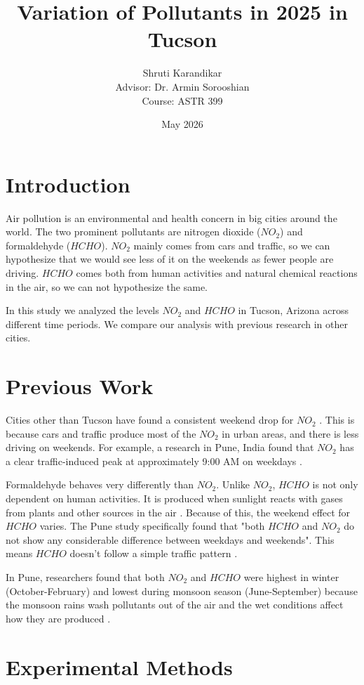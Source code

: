 \documentclass{article}
\title{Variation of Pollutants in 2025 in Tucson}
\author{Shruti Karandikar\\
    \small Advisor: Dr. Armin Sorooshian\\
    \small Course: ASTR 399}
\date{May 2026}
\begin{document}
\maketitle

\section{Introduction}

Air pollution is an environmental and health concern in big cities around the world. The two prominent pollutants are nitrogen dioxide ($NO_2$) and formaldehyde ($HCHO$). $NO_2$ mainly comes from cars and traffic, so we can hypothesize that we would see less of it on the weekends as fewer people are driving. $HCHO$ comes both from human activities and natural chemical reactions in the air, so we can not hypothesize the same.

In this study we analyzed the levels $NO_2$ and $HCHO$ in Tucson, Arizona across different time periods. We compare our analysis with previous research in other cities.

\section{Previous Work}

Cities other than Tucson have found a consistent weekend drop for $NO_2$ \cite{HM2025, BM2021A, BM2021B}. This is because cars and traffic produce most of the $NO_2$ in urban areas, and there is less driving on weekends. For example, a research in Pune, India found that $NO_2$ has a clear traffic-induced peak at approximately 9:00 AM on weekdays \cite{BM2021B}.

Formaldehyde behaves very differently than $NO_2$. Unlike $NO_2$, $HCHO$ is not only dependent on  human activities. It is produced when sunlight reacts with gases from plants and other sources in the air \cite{BM2021A}. Because of this, the weekend effect for $HCHO$ varies. The Pune study specifically found that "both $HCHO$ and $NO_2$ do not show any considerable difference between weekdays and weekends". This means $HCHO$ doesn't follow a simple traffic pattern \cite{BM2021B}.

In Pune, researchers found that both $NO_2$ and $HCHO$ were highest in winter (October-February) and lowest during monsoon season (June-September) because the monsoon rains wash pollutants out of the air and the wet conditions affect how they are produced \cite{BM2021B}. 


\section{Experimental Methods}
\end{document}
